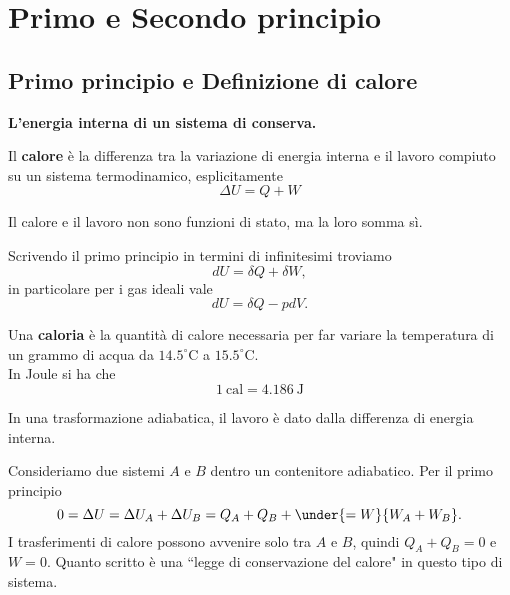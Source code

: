\chapter{Primo e Secondo principio}
\section{Primo principio e Definizione di calore}

\begin{fact}
\textbf{L'energia interna di un sistema di conserva.}
\end{fact}

\begin{definition}[Calore]
Il \textbf{calore} \`e la differenza tra la variazione di energia interna e il lavoro compiuto su un sistema termodinamico, esplicitamente
\[\boxed{\Delta U=Q+W}\]
\end{definition}

\begin{remark}
Il calore e il lavoro non sono funzioni di stato, ma la loro somma s\`i.
\end{remark}

\begin{remark}
Scrivendo il primo principio in termini di infinitesimi troviamo
\[dU=\delta Q+\delta W,\]
in particolare per i gas ideali vale
\[dU=\delta Q-pdV.\]
\end{remark}


\begin{definition}[Caloria]
Una \textbf{caloria} \`e la quantit\`a di calore necessaria per far variare la temperatura di un grammo di acqua da $14.5^\circ\mathrm{C}$ a $15.5^\circ\mathrm{C}$.\\
In Joule si ha che
\[\boxed{1\ \mathrm{cal}=4.186\ \mathrm{J}}\]
\end{definition}


\begin{remark}
In una trasformazione adiabatica, il lavoro \`e dato dalla differenza di energia interna.
\end{remark}
\begin{example}
Consideriamo due sistemi $A$ e $B$ dentro un contenitore adiabatico. Per il primo principio
\[0=\Delta U=\Delta U_A+\Delta U_B=Q_A+Q_B+\under{=W}{W_A+W_B}.\]
I trasferimenti di calore possono avvenire solo tra $A$ e $B$, quindi $Q_A+Q_B=0$ e $W=0$. Quanto scritto \`e una ``legge di conservazione del calore" in questo tipo di sistema.
\end{example}

